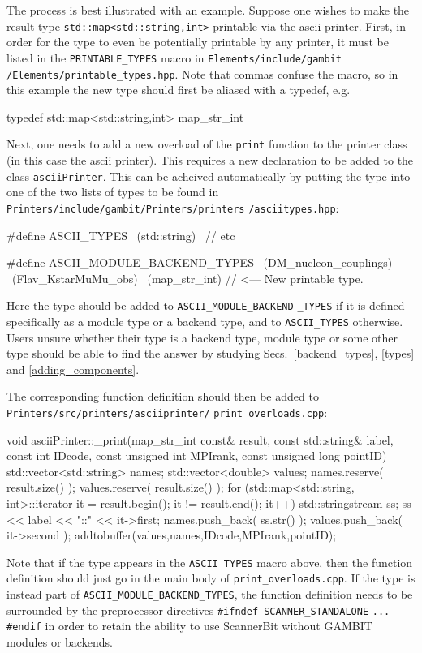\documentclass[pdftex,twocolumn,epjc3_preprint,runningheads]{svjour3}
\renewcommand{\_}{\discretionary{\underscore}{}{\underscore}}
\newcommand\cpp[1]{{\lstinline!#1!}}  %
\newcommand\term[1]{{\lstset{style=terminal}\lstinline!#1!\lstset{style=cpp}}}
\newcommand{\gambit}{\textsf{GAMBIT}\xspace}
\newcommand{\scannerbit}{\textsf{ScannerBit}\xspace}
\newcommand{\GB}{\gambit}
\begin{document}
The process is best illustrated with an example. Suppose one wishes to make the result type \cpp{std::map<std::string,int>} printable via the \textsf{ascii} printer. First, in order for the type to even be potentially printable by any printer, it must be listed in the \cpp{PRINTABLE_TYPES} macro in \term{Elements/include/gambit} \term{/Elements/printable_types.hpp}. Note that commas confuse the macro, so in this example the new type should first be aliased with a typedef, e.g.
\begin{lstcpp}
typedef std::map<std::string,int> map_str_int
\end{lstcpp}

Next, one needs to add a new overload of the \cpp{print} function to the printer class (in this case the \textsf{ascii} printer).  This requires a new declaration to be added to the class \cpp{asciiPrinter}.  This can be acheived automatically by putting the type into one of the two lists of types to be found in \term{Printers/}\term{include/gambit/Printers}\term{/printers} \term{/asciitypes.hpp}:
\begin{lstcpp}
#define ASCII_TYPES                         \
  (std::string)                             \
  // etc

#define ASCII_MODULE_BACKEND_TYPES          \
  (DM_nucleon_couplings)                    \
  (Flav_KstarMuMu_obs)                      \
  (map_str_int) // <--- New printable type.
\end{lstcpp}
Here the type should be added to \term{ASCII_MODULE_BACKEND} \term{_TYPES} if it is defined specifically as a module type or a backend type, and to \term{ASCII_TYPES} otherwise.  Users unsure whether their type is a backend type, module type or some other type should be able to find the answer by studying Secs.\ \ref{backend_types}, \ref{types} and \ref{adding_components}.

The corresponding function definition should then be added to \term{Printers/src/printers/asciiprinter/} \term{print_overloads.cpp}:
%
\begin{lstcpp}
void asciiPrinter::_print(map_str_int const&
 result, const std::string& label, const int
 IDcode, const unsigned int MPIrank, const
 unsigned long pointID)
{
  std::vector<std::string> names;
  std::vector<double> values;
  names.reserve( result.size() );
  values.reserve( result.size() );
  for (std::map<std::string, int>::iterator
   it = result.begin(); it != result.end(); it++)
  {
    std::stringstream ss;
    ss << label << "::" << it->first;
    names.push_back( ss.str() );
    values.push_back( it->second );
  }
  addtobuffer(values,names,IDcode,MPIrank,pointID);
}
\end{lstcpp}
%
Note that if the type appears in the \term{ASCII_TYPES} macro above, then the function definition should just go in the main body of \term{print_overloads.cpp}.  If the type is instead part of \term{ASCII_MODULE_BACKEND_TYPES}, the function definition needs to be surrounded by the preprocessor directives \cpp{#ifndef SCANNER_STANDALONE} \cpp{...} \cpp{#endif} in order to retain the ability to use \scannerbit without \GB modules or backends.
\end{document}
